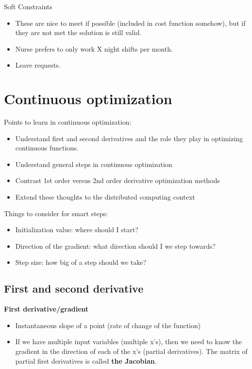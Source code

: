 \documentclass[fontset=fandol,zihao=false,scheme=chinese,heading=true,UTF8]{ctexbook}
\providecommand{\tightlist}{%
  \setlength{\itemsep}{0pt}\setlength{\parskip}{0pt}}
\begin{document}
Soft Constraints

\begin{itemize}
\tightlist
\item
  These are nice to meet if possible (included in cost function somehow), but if they are not met the solution is still valid.
\item
  Nurse prefers to only work X night shifts per month.
\item
  Leave requests.
\end{itemize}

\hypertarget{continuous-optimization}{%
\chapter{Continuous optimization}\label{continuous-optimization}}

Points to learn in continuous optimization:

\begin{itemize}
\tightlist
\item
  Understand first and second derivatives and the role they play in optimizing continuous functions.
\item
  Understand general steps in continuous optimization
\item
  Contrast 1st order versus 2nd order derivative optimization methods
\item
  Extend these thoughts to the distributed computing context
\end{itemize}

Things to consider for smart steps:

\begin{itemize}
\tightlist
\item
  Initialization value: where should I start?
\item
  Direction of the gradient: what direction should I we step towards?
\item
  Step size: how big of a step should we take?
\end{itemize}

\hypertarget{first-and-second-derivative}{%
\section{First and second derivative}\label{first-and-second-derivative}}

\textbf{First derivative/gradient}

\begin{itemize}
\tightlist
\item
  Instantaneous slope of a point (rate of change of the function)
\item
  If we have multiple input variables (multiple x's), then we need to know the gradient in the direction of each of the x's (partial derivatives). The matrix of partial first derivatives is called \textbf{the Jacobian}.
\end{itemize}
\end{document}
